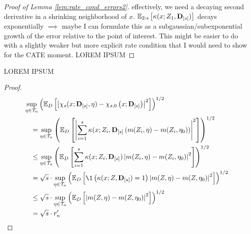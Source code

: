 \begin{proof}[Proof of Lemma \ref{lem:rate_cond_errors2}]
    {\color{blue} effectively, we need a decaying second derivative in a shrinking neighborhood of $x$.
    $\mathbb{E}_{2:s}\left[\kappa(x; Z_{1}, \mathbf{D}_{[s]})\right]$ decays exponentially $\implies$ maybe I can formulate this as a subgaussian/subexponential growth of the error relative to the point of interest.
    This might be easier to do with a slightly weaker but more explicit rate condition that I would need to show for the CATE moment.}
    {\color{red} LOREM IPSUM}
\end{proof}

\begin{boxD}
    \begin{lem}
        {\color{red} LOREM IPSUM}
    \end{lem}    
\end{boxD}

\begin{proof}
    \begin{equation}
        \begin{aligned}
            & \sup_{\eta \in \mathcal{T}_{n}}\left(
                \E_{D}\left[
                    \left|\chi_{s}(x; \mathbf{D}_{[s]}, \eta) - \chi_{s,0}\left(x; \mathbf{D}_{[s]}\right)
                    \right|^2
                \right]
            \right)^{1 / 2} \\
            & \quad = \sup_{\eta \in \mathcal{T}_{n}}\left(
                \E_{D}\left[
                    \left|\sum_{i = 1}^{s} \kappa(x; Z_{i}, \mathbf{D}_{[s]}
                    \left(m(Z_{i}, \eta) - m(Z_{i}, \eta_{0})\right)
                    \right|^2
                \right]
            \right)^{1 / 2} \\
            & \quad \leq \sup_{\eta \in \mathcal{T}_{n}}\left(
                \E_{D}\left[\sum_{i = 1}^{s}\kappa(x; Z_{i}, \mathbf{D}_{[s]})
                    \left| m(Z_{i}, \eta) - m(Z_{i}, \eta_{0})\right|^2
                \right]
            \right)^{1 / 2} \\
            & \quad = \sqrt{s}\cdot \sup_{\eta \in \mathcal{T}_{n}}\left(
                 \E_{D}\left[\1\left(\kappa(x; Z, \mathbf{D}_{[s]}) = 1\right)
                    \left| m(Z, \eta) - m(Z, \eta_{0})\right|^2
                \right]
            \right)^{1 / 2} \\
            & \quad \leq \sqrt{s} \cdot \sup_{\eta \in \mathcal{T}_{n}}\left(
                \E_{D}\left[\left| m(Z, \eta) - m(Z, \eta_{0})\right|^2\right]
            \right)^{1 / 2} \\
            & \quad = \sqrt{s} \cdot r_{n}^{\prime}
        \end{aligned}
    \end{equation}
\end{proof}


